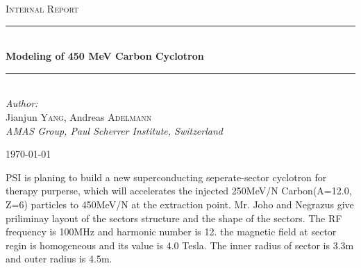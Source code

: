 \documentclass[12pt,a4paper]{report}
\newcommand{\HRule}{\rule{\linewidth}{0.5mm}}
\begin{document}
  \begin{titlepage}
    
    \begin{center}
    
            
      
      \textsc{\Large Internal Report}\\[5.0cm]
  
      \HRule \\[0.4cm]
	     { \huge \bfseries Modeling of 450 MeV Carbon Cyclotron}\\[0.4cm]
	     
     \HRule \\[1.5cm]
	
     \emph{Author:}\\[0.7cm]
     Jianjun \textsc{Yang}, 
     Andreas \textsc{Adelmann}\\ 
     \emph{AMAS Group, Paul Scherrer Institute, Switzerland}\\ [1.0cm]
          
     \vfill
     
	 {\large \today}
	 
    \end{center}
    
  \end{titlepage}
PSI is planing to build a new superconducting seperate-sector cyclotron for therapy purperse, which will accelerates the injected 250MeV/N Carbon(A=12.0, Z=6) 
particles to 450MeV/N at the extraction point. Mr. Joho and Negrazus give priliminay layout of the sectors structure and the shape of the sectors. 
The RF frequency is 100MHz and harmonic number is 12. the magnetic field at sector regin is homogeneous and its value is 4.0 Tesla.  The inner radius of sector 
is 3.3m and outer radius is 4.5m.
\end{document}
